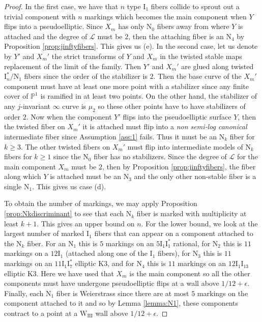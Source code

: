 \documentclass[11pt]{amsart}
\theoremstyle{definition}
\theoremstyle{remark}
\newcommand{\mb}[1]{\mathbb{#1}}
\begin{document}
\begin{proof}
		In the first case, we have that $n$ type $\mathrm{I}_1$ fibers collide to sprout out a trivial component with $n$ markings which becomes the main component when $Y$ flips into a pseudoelliptic. Since $X_m$ has only $\mathrm{N}_0$ fibers away from where $Y$ is attached and the degree of $\mathscr{L}$ must be $2$, then the attaching fiber is an $\mathrm{N}_4$ by Proposition \ref{prop:jinftyfibers}. This gives us (e). In the second case, let us denote by $Y'$ and $X_m'$ the strict transforms of $Y$ and $X_m$ in the twisted stable maps replacement of the limit of the family. Then $Y'$ and $X_m'$ are glued along twisted $\mathrm{I}_n^*/\mathrm{N}_1$ fibers since the order of the stabilizer is $2$. Then the base curve of the $X_m'$ component must have at least one more point with a stabilizer since any finite cover of $\mb{P}^1$ is ramified in at least two points. On the other hand, the stabilizer of any $j$-invariant $\infty$ curve is $\mu_2$ so these other points have to have stabilizers of order $2$. Now when the component $Y'$ flips into the pseudoelliptic surface $Y$, then the twisted fiber on $X_m'$ it is attached must flip into a \emph{non semi-log canonical} intermediate fiber since Assumption \ref{ass:1} fails. Thus it must be an $\mathrm{N}_k$ fiber for $k \geq 3$. The other twisted fibers on $X_m'$ must flip into intermediate models of $\mathrm{N}_k$ fibers for $k \geq 1$ since the $\mathrm{N}_0$ fiber has no stabilizers. Since the degree of $\mathscr{L}$ for the main component $X_m$ must be $2$, then by Proposition \ref{prop:jinftyfibers}, the fiber along which $Y$ is attached must be an $\mathrm{N}_3$ and the only other non-stable fiber is a single $\mathrm{N}_1$. This gives us case (d).  
		
		To obtain the number of markings, we may apply Proposition \ref{prop:Nkdiscriminant} to see that each $\mathrm{N}_k$ fiber is marked with multiplicity at least $k + 1$. This gives an upper bound on $n$. For the lower bound, we look at the largest number of marked $\mathrm{I}_1$ fibers that can appear on a component attached to the $\mathrm{N}_k$ fiber. For an $\mathrm{N}_1$ this is $5$ markings on an $5\mathrm{I}_1\mathrm{I}_1^*$ rational, for $\mathrm{N}_2$ this is $11$ markings on a $12\mathrm{I}_1$ (attached along one of the $\mathrm{I}_1$ fibers), for $\mathrm{N}_3$ this is $11$ markings on an $11\mathrm{I}_1\mathrm{I}_7^*$ elliptic K3, and for $\mathrm{N}_4$ this is $11$ markings on an $12\mathrm{I}_1\mathrm{I}_{13} $ elliptic K3. Here we have used that $X_m$ is the main component so all the other components must have undergone pseudoelliptic flips at a wall above $1/12 + \epsilon$. Finally, each $\mathrm{N}_1$ fiber is Weierstrass since there are at most $5$ markings on the component attached to it and so by Lemma \ref{lemma:N1}, these components contract to a point at a $\mathrm{W}_{\mathrm{III}}$ wall above $1/12 + \epsilon$.
	\end{proof} 
	
\end{document}
